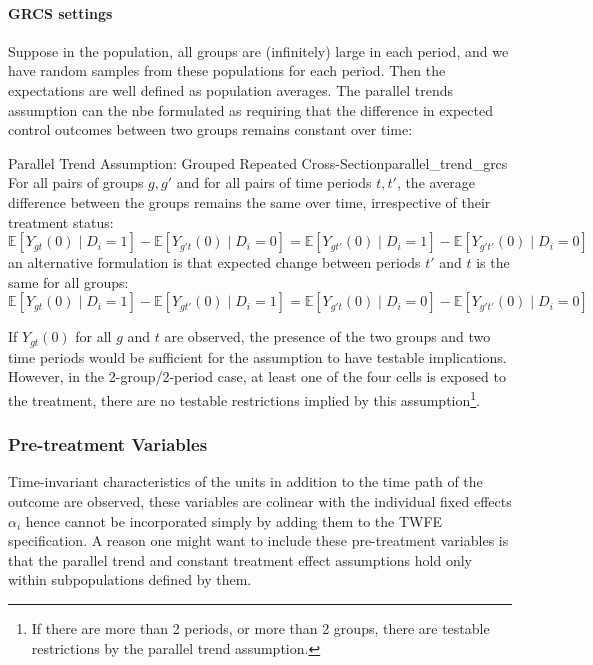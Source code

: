 \documentclass[twoside]{article}
\begin{document}
\paragraph*{GRCS settings} Suppose in the population, all groups are (infinitely) large in each period, and we have random samples from these populations for each period. Then the expectations are well defined as population averages.
The parallel trends assumption can the nbe formulated as requiring that the difference in expected control outcomes between two groups remains constant over time: 
\begin{assumption}{Parallel Trend Assumption: Grouped Repeated Cross-Section}{parallel_trend_grcs}
    For all pairs of groups $g,g'$ and for all pairs of time periods $t,t'$, the average difference between the groups remains the same over time, irrespective of their treatment status: 
    \begin{equation*}
        \mathbb{E}\left[Y_{gt}(0)\mid D_i=1\right] - \mathbb{E}\left[Y_{g't}(0)\mid D_i=0\right] = \mathbb{E}\left[Y_{gt'}(0)\mid D_i=1\right] - \mathbb{E}\left[Y_{g't'}(0)\mid D_i=0\right]
    \end{equation*}
    an alternative formulation is that expected change between periods $t'$ and $t$ is the same for all groups:
    \begin{equation*}
        \mathbb{E}\left[Y_{gt}(0)\mid D_i=1\right] - \mathbb{E}\left[Y_{gt'}(0)\mid D_i=1\right] = \mathbb{E}\left[Y_{g't}(0)\mid D_i=0\right] - \mathbb{E}\left[Y_{g't'}(0)\mid D_i=0\right]
    \end{equation*}
\end{assumption}
If $Y_{gt}(0)$ for all $g$ and $t$ are observed, the presence of the two groups and two time periods would be sufficient for the assumption to have testable implications. However, in the 2-group/2-period case, at least one of the four cells is exposed to the treatment, there are no testable restrictions implied by this assumption\footnote{If there are more than 2 periods, or more than 2 groups, there are testable restrictions by the parallel trend assumption.}.

\subsubsection{Pre-treatment Variables}

Time-invariant characteristics of the units in addition to the time path of the outcome are observed, these variables are colinear with the individual fixed effects $\alpha_i$ hence cannot be incorporated simply by adding them to the TWFE specification.
A reason one might want to include these pre-treatment variables is that the parallel trend and constant treatment effect assumptions hold only within subpopulations defined by them.
\end{document}
